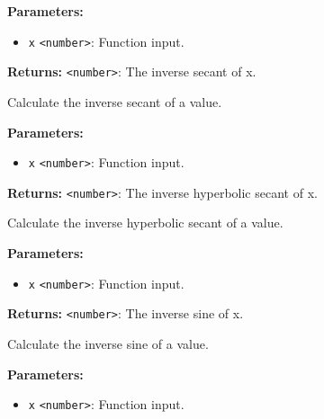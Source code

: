 \documentclass[12pt,a4paper]{article}
\begin{document}
\noindent \textbf{Parameters:}
\begin{itemize}
  \item \texttt{x} \texttt{<number>}: Function input.
\end{itemize}

\noindent \textbf{Returns:} \texttt{<number>}: The inverse secant of \textasciigrave{}x\textasciigrave{}.

\noindent Calculate the inverse secant of a value.

\vspace{5mm}
\noindent {}


\noindent \textbf{Parameters:}
\begin{itemize}
  \item \texttt{x} \texttt{<number>}: Function input.
\end{itemize}

\noindent \textbf{Returns:} \texttt{<number>}: The inverse hyperbolic secant of \textasciigrave{}x\textasciigrave{}.

\noindent Calculate the inverse hyperbolic secant of a value.

\vspace{5mm}
\noindent {}


\noindent \textbf{Parameters:}
\begin{itemize}
  \item \texttt{x} \texttt{<number>}: Function input.
\end{itemize}

\noindent \textbf{Returns:} \texttt{<number>}: The inverse sine of \textasciigrave{}x\textasciigrave{}.

\noindent Calculate the inverse sine of a value.

\vspace{5mm}
\noindent {}


\noindent \textbf{Parameters:}
\begin{itemize}
  \item \texttt{x} \texttt{<number>}: Function input.
\end{itemize}
\end{document}

